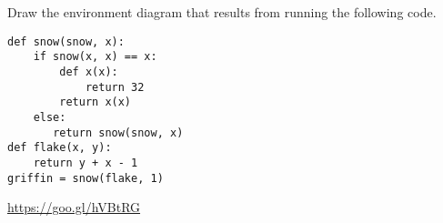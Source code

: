\question Draw the environment diagram that results from running the following code.

\begin{lstlisting}
def snow(snow, x):
    if snow(x, x) == x:
        def x(x):
            return 32
        return x(x)
    else:
       return snow(snow, x)
def flake(x, y):
    return y + x - 1
griffin = snow(flake, 1)
\end{lstlisting}

\begin{solution}[2in]
\url{https://goo.gl/hVBtRG}
\end{solution}